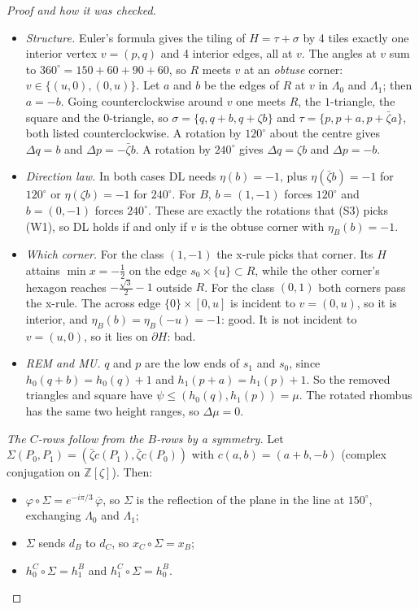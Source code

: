 \documentclass[11pt]{article}
\theoremstyle{definition}\newtheorem{definition}[theorem]{Definition}\newtheorem{remark}[theorem]{Remark}
\newcommand{\Z}{\mathbb Z}
\begin{document}
\begin{proof}[Proof and how it was checked]
\begin{itemize}
\item[b.] \emph{Structure.} Euler's formula gives the tiling of $H=\tau+\sigma$ by 4 tiles exactly one interior vertex $v=(p,q)$ and 4 interior edges, all at $v$. The angles at $v$ sum to $360^\circ=150+60+90+60$, so $R$ meets $v$ at an \emph{obtuse} corner: $v\in\{(u,0),(0,u)\}$.
Let $a$ and $b$ be the edges of $R$ at $v$ in $\Lambda_0$ and $\Lambda_1$; then $a=-b$. Going counterclockwise around $v$ one meets $R$, the $1$-triangle, the square and the $0$-triangle, so $\sigma=\{q,q+b,q+\zeta b\}$ and $\tau=\{p,p+a,p+\bar\zeta a\}$, both listed counterclockwise.
A rotation by $120^\circ$ about the centre gives $\Delta q=b$ and $\Delta p=-\bar\zeta b$. A rotation by $240^\circ$ gives $\Delta q=\zeta b$ and $\Delta p=-b$.
\item[] \emph{Direction law.} In both cases DL needs $\eta(b)=-1$, plus $\eta(\bar\zeta b)=-1$ for $120^\circ$ or $\eta(\zeta b)=-1$ for $240^\circ$.
For $B$, $b=(1,-1)$ forces $120^\circ$ and $b=(0,-1)$ forces $240^\circ$. These are exactly the rotations that (S3) picks (W1), so DL holds if and only if $v$ is the obtuse corner with $\eta_B(b)=-1$.
\item[] \emph{Which corner.} For the class $(1,-1)$ the x-rule picks that corner. Its $H$ attains $\min x=-\tfrac12$ on the edge $s_0\times\{u\}\subset R$, while the other corner's hexagon reaches $-\tfrac{\sqrt3}2-1$ outside $R$. For the class $(0,1)$ both corners pass the x-rule.
The across edge $\{0\}\times[0,u]$ is incident to $v=(0,u)$, so it is interior, and $\eta_B(b)=\eta_B(-u)=-1$: good. It is not incident to $v=(u,0)$, so it lies on $\partial H$: bad.
\item[] \emph{REM and MU.} $q$ and $p$ are the low ends of $s_1$ and $s_0$, since $h_0(q+b)=h_0(q)+1$ and $h_1(p+a)=h_1(p)+1$. So the removed triangles and square have $\psi\le(h_0(q),h_1(p))=\mu$. The rotated rhombus has the same two height ranges, so $\Delta\mu=0$.
\end{itemize}
\emph{The $C$-rows follow from the $B$-rows by a symmetry.} Let $\Sigma(P_0,P_1)=(\bar\zeta c(P_1),\bar\zeta c(P_0))$ with $c(a,b)=(a+b,-b)$ (complex conjugation on $\Z[\zeta]$). Then:
\begin{itemize}
\item $\varphi\circ\Sigma=e^{-i\pi/3}\,\overline{\varphi}$, so $\Sigma$ is the reflection of the plane in the line at $150^\circ$, exchanging $\Lambda_0$ and $\Lambda_1$;
\item $\Sigma$ sends $d_B$ to $d_C$, so $x_C\circ\Sigma=x_B$;
\item $h_0^C\circ\Sigma=h_1^B$ and $h_1^C\circ\Sigma=h_0^B$.

\end{itemize}
\end{proof}
\end{document}
